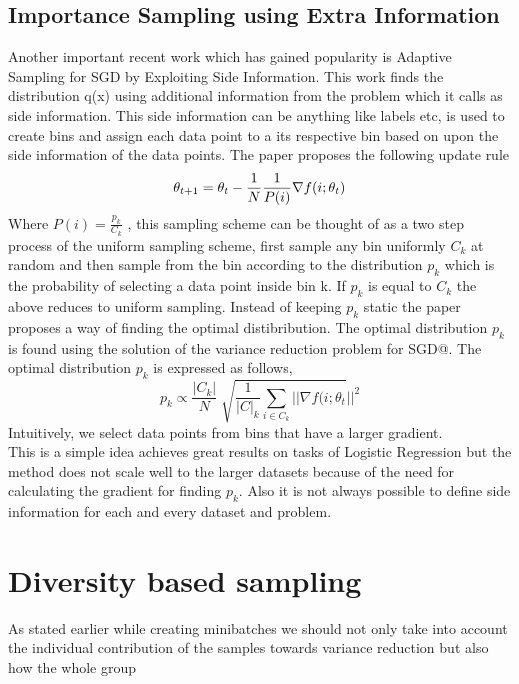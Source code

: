 \documentclass[a4paper,twoside]{iiththesis}
\theoremstyle{definition}
\theoremstyle{definition}
\theoremstyle{remark}
\begin{document}
\section{Importance Sampling using Extra Information}

Another important recent work which has gained popularity is Adaptive Sampling for SGD by Exploiting Side Information\cite{gopal2016adaptive}. This work finds the distribution q(x) using additional information from the problem which it calls as side information. This side information can be anything like labels etc, is used to create bins and assign each data point to a its respective bin based on upon the side information of the data points. The paper proposes the following update rule 
\begin{equation}
\theta_{t+1} = \theta_{t} - \frac{1}{N} \frac{1}{P(i)}\nabla f(i; \theta_{t}) \\ 
\end{equation}
Where  $P(i) = \frac{p_k}{C_k}$ , this sampling scheme can be thought of as a two step process of the uniform sampling scheme, first sample any bin uniformly  $C_k$ at random and then sample from the bin according to the distribution $p_k$ which is the probability of selecting a data point inside bin k. If $p_k$ is equal to $C_k$ the above reduces to uniform sampling. Instead of keeping $p_k$ static the paper proposes a way of finding the optimal distibribution. The optimal distribution $p_k$ is found using the solution of the variance reduction problem for SGD@. The optimal distribution $p_k$ is expressed as follows, 
\begin{equation} \label{gopal}
p_k \propto \frac{|C_k|}{N} \sqrt[]{\frac{1}{|C|_k} \sum_{i \in C_k } || \nabla f(i; \theta_t} || ^2
\end{equation}
Intuitively, we select data points from bins that have a larger gradient. \\
This is a simple idea achieves great results on tasks of Logistic Regression but the method does not scale well to the larger datasets because of the need for calculating the gradient for finding $p_k$. Also it is not always possible to define side information for each and every dataset and problem.  

\chapter{Diversity based sampling}

As stated earlier while creating minibatches we should not only take into account the individual contribution of the samples towards variance reduction but also how the whole group
\end{document}
